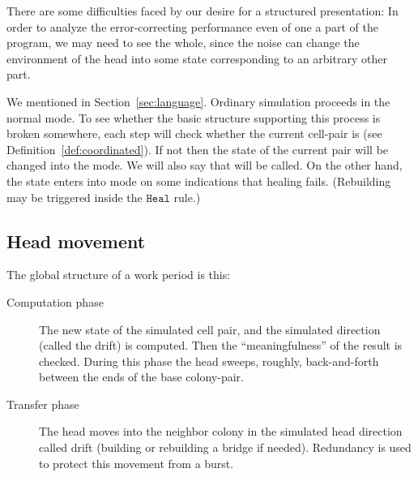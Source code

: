\documentclass[11pt]{memoir}
\theoremstyle{definition} %
\renewcommand{\le}{\leq}
\newcommand{\fld}[1]{\ensuremath{\textit{#1\/}}}
\newcommand{\rul}[1]{\ensuremath{\texttt{#1}}}
\newcommand{\rHeal}{\rul{Heal}}
\newcommand{\Sweep}{\fld{Sweep}}
\newcommand{\Coordinated}{\mathrm{Coordinated}}
\newcommand{\Last}{\mathrm{Last}}
\newcommand{\TransferSw}{\mathrm{TransferSw}}
\newcommand{\Comp}{\rul{Compute}}
\newcommand{\Transfer}{\rul{Transfer}}
\begin{document}
There are some difficulties faced by our desire for a structured presentation:
In order to analyze the error-correcting performance even of one a part of the  program,
we may need to see the whole, since the noise can change the environment of the head into  
some state corresponding to an arbitrary other part.

We mentioned  in Section~\ref{sec:language}.
Ordinary simulation proceeds in the normal mode. 
To see whether the basic structure
supporting this process is broken somewhere, each step will check 
whether the current cell-pair is 
(see Definition~\ref{def:coordinated}).
If not then the state of the current pair will be changed into the  mode.
We will also say that  will be called.
On the other hand, the state enters into  mode on some indications that
healing fails.
(Rebuilding may be triggered inside the \( \rHeal \) rule.)




\subsection{Head movement}\label{sec:sweep}

The global structure of a work period is this:
\begin{description}

\item[Computation phase] 
The new state of the simulated cell pair, and the simulated direction (called the drift) is computed.
Then the ``meaningfulness'' of the result is checked.
During this phase the head sweeps, roughly, back-and-forth between
the ends of the base colony-pair.

\item[Transfer phase]
  The head moves into the neighbor colony in the simulated head direction called drift (building or rebuilding
  a bridge if needed).
  Redundancy is used to protect this movement from a burst.  
\end{description}
\end{document}
